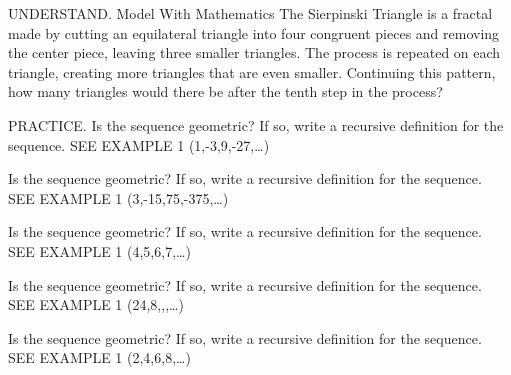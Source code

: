 \documentclass{article}
\newenvironment{practice}[2]{}{}        %
\newcommand{\answer}[1]{}               %
\newcommand{\placeholder}[2]{}          %
\begin{document}
\begin{practice}{15}{2}
UNDERSTAND. Model With Mathematics The Sierpinski Triangle is a fractal made by cutting an equilateral triangle into four congruent pieces and removing the center piece, leaving three smaller triangles. The process is repeated on each triangle, creating more triangles that are even smaller. Continuing this pattern, how many triangles would there be after the tenth step in the process?
\placeholder{diagram}{Sierpinski Triangle stages joined by right arrows. Start with solid blue equilateral triangle; next remove one inverted central triangle in green, leaving three blue triangles; repeat central removal recursively to show 9,27,81 blue triangles. First three stages across upper row, then two stages below.}
\answer{59,049}
\end{practice}
\begin{practice}{16}{1}
PRACTICE. Is the sequence geometric? If so, write a recursive definition for the sequence. SEE EXAMPLE 1
(1,-3,9,-27,\ldots)
\answer{yes; (a_n=\begin{cases}1,&\text{if }n=1\\-3a_{n-1},&\text{if }n>1\end{cases})}
\end{practice}
\begin{practice}{17}{1}
Is the sequence geometric? If so, write a recursive definition for the sequence. SEE EXAMPLE 1
(3,-15,75,-375,\ldots)
\answer{yes; (a_n=\begin{cases}3,&\text{if }n=1\\-5a_{n-1},&\text{if }n>1\end{cases})}
\end{practice}
\begin{practice}{18}{1}
Is the sequence geometric? If so, write a recursive definition for the sequence. SEE EXAMPLE 1
(4,5,6,7,\ldots)
\answer{no}
\end{practice}
\begin{practice}{19}{1}
Is the sequence geometric? If so, write a recursive definition for the sequence. SEE EXAMPLE 1
(24,8,,,\ldots)
\answer{yes; (a_n=\begin{cases}24,&\text{if }n=1\\\frac{1}{3}a_{n-1},&\text{if }n>1\end{cases})}
\end{practice}
\begin{practice}{20}{1}
Is the sequence geometric? If so, write a recursive definition for the sequence. SEE EXAMPLE 1
(2,4,6,8,\ldots)
\answer{no}
\end{practice}
\end{document}
